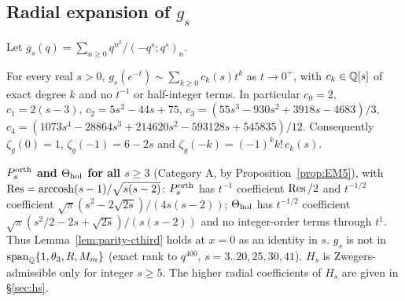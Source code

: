 \subsection{Radial expansion of $g_s$}\label{app:gs}
Let $g_s(q)=\sum_{n\ge0}q^{n^2}/(-q^s;q^s)_n$.
\begin{theorem}\label{thm:Gs}
For every real $s>0$, $g_s(e^{-t})\sim\sum_{k\ge0}c_k(s)t^k$ as $t\to0^+$, with $c_k\in\mathbb{Q}[s]$ of exact degree $k$ and no $t^{-1}$ or
half-integer terms. In particular $c_0=2$, $c_1=2(s-3)$, $c_2=5s^2-44s+75$, $c_3=(55s^3-930s^2+3918s-4683)/3$,
$c_4=(1073s^4-28864s^3+214620s^2-593128s+545835)/12$. Consequently $\zeta_g(0)=1$, $\zeta_g(-1)=6-2s$ and $\zeta_g(-k)=(-1)^kk!\,c_k(s)$.
\end{theorem}
\noindent\textbf{$P^{\mathrm{orth}}_s$ and $\Theta_{\mathrm{hol}}$ for all $s\ge3$} (Category A, by Proposition~\ref{prop:EM5}), with $\operatorname*{Res}=\operatorname{arccosh}(s-1)/\sqrt{s(s-2)}$:
$P^{\mathrm{orth}}_s$ has $t^{-1}$ coefficient $\operatorname*{Res}/2$ and $t^{-1/2}$ coefficient $\sqrt\pi(s^2-2\sqrt{2s})/(4s(s-2))$; $\Theta_{\mathrm{hol}}$ has $t^{-1/2}$ coefficient
$\sqrt\pi(s^2/2-2s+\sqrt{2s})/(s(s-2))$ and no integer-order terms through $t^1$. Thus Lemma~\ref{lem:parity-cthird} holds at $x=0$ as an identity in $s$. $g_s$ is not
in $\mathrm{span}_{\mathbb{Q}}\{1,\theta_3,R,M_m\}$ (exact rank to $q^{400}$, $s=3..20,25,30,41$). $H_s$ is Zwegers-admissible only for integer $s\ge5$.
The higher radial coefficients of $H_s$ are given in \S\ref{sec:hs}.

